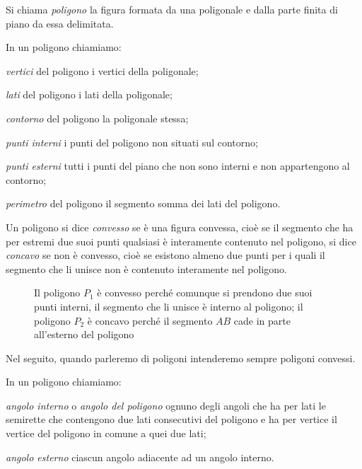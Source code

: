\begin{definizione}
Si chiama \emph{poligono} la figura formata da una poligonale e dalla 
parte finita di piano da essa delimitata.
\end{definizione}

\begin{definizione}
In un poligono chiamiamo:
\begin{itemize*}
\item \emph{vertici} del poligono i vertici della poligonale;
\item \emph{lati} del poligono i lati della poligonale;
\item \emph{contorno} del poligono la poligonale stessa;
\item \emph{punti interni} i punti del poligono non situati sul 
contorno;
\item \emph{punti esterni} tutti i punti del piano che non sono 
interni e non appartengono al contorno;
\item \emph{perimetro} del poligono il segmento somma dei lati del 
poligono.
\end{itemize*}
\end{definizione}

\begin{definizione}
Un poligono si dice \emph{convesso} se è una figura convessa, cioè se 
il segmento che ha per estremi due suoi punti qualsiasi è interamente 
contenuto nel poligono, si dice \emph{concavo} se non è convesso, 
cioè se esistono almeno due punti per i quali il segmento che li 
unisce non è contenuto interamente nel poligono.
\end{definizione}


\begin{inaccessibleblock}
 \begin{figure}[htb]
\centering
\caption{Il poligono $P_1$ è convesso perché comunque si prendono due 
suoi punti interni, il segmento che li unisce è interno al poligono; 
il poligono $P_2$ è concavo perché il segmento $AB$ cade in parte 
all'esterno del poligono}
\end{figure}
\end{inaccessibleblock}

Nel seguito, quando parleremo di poligoni intenderemo sempre poligoni 
convessi.

\begin{definizione}
In un poligono chiamiamo:
\begin{itemize*}
\item \emph{angolo interno} o \emph{angolo del poligono} ognuno degli 
angoli che ha per lati le semirette che contengono due lati 
consecutivi del poligono e ha per vertice il vertice del poligono in 
comune a quei due lati;
\item \emph{angolo esterno} ciascun angolo adiacente ad un angolo 
interno.
\end{itemize*}
\end{definizione}


